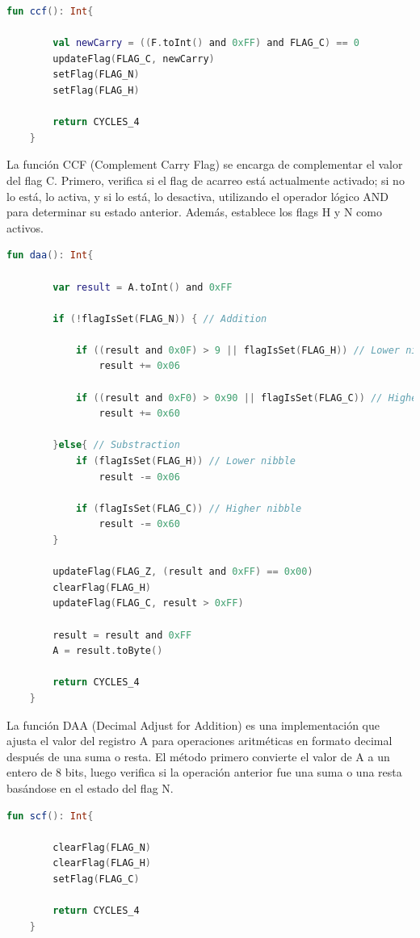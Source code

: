 \begin{lstlisting}[language=Kotlin, caption={Operación CCF}, label={code:kotlinccf}]
    fun ccf(): Int{

        val newCarry = ((F.toInt() and 0xFF) and FLAG_C) == 0
        updateFlag(FLAG_C, newCarry)
        setFlag(FLAG_N)
        setFlag(FLAG_H)

        return CYCLES_4
    }
\end{lstlisting}

La función CCF (Complement Carry Flag) se encarga de complementar el valor del flag C. Primero, verifica si el flag de acarreo está actualmente activado; si no lo está, lo activa, y si lo está, lo desactiva, utilizando el operador lógico AND para determinar su estado anterior. Además, establece los flags H y N como activos.

\begin{lstlisting}[language=Kotlin, caption={Operación DAA}, label={code:kotlindaa}]
    fun daa(): Int{

        var result = A.toInt() and 0xFF

        if (!flagIsSet(FLAG_N)) { // Addition

            if ((result and 0x0F) > 9 || flagIsSet(FLAG_H)) // Lower nibble
                result += 0x06

            if ((result and 0xF0) > 0x90 || flagIsSet(FLAG_C)) // Higher nibble
                result += 0x60

        }else{ // Substraction
            if (flagIsSet(FLAG_H)) // Lower nibble
                result -= 0x06

            if (flagIsSet(FLAG_C)) // Higher nibble
                result -= 0x60
        }

        updateFlag(FLAG_Z, (result and 0xFF) == 0x00)
        clearFlag(FLAG_H)
        updateFlag(FLAG_C, result > 0xFF)

        result = result and 0xFF
        A = result.toByte()

        return CYCLES_4
    }
\end{lstlisting}

La función DAA (Decimal Adjust for Addition) es una implementación que ajusta el valor del registro A para operaciones aritméticas en formato decimal después de una suma o resta. El método primero convierte el valor de A a un entero de 8 bits, luego verifica si la operación anterior fue una suma o una resta basándose en el estado del flag N.

\begin{lstlisting}[language=Kotlin, caption={Operación SCF}, label={code:kotlinscf}]
    fun scf(): Int{

        clearFlag(FLAG_N)
        clearFlag(FLAG_H)
        setFlag(FLAG_C)

        return CYCLES_4
    }
\end{lstlisting}

